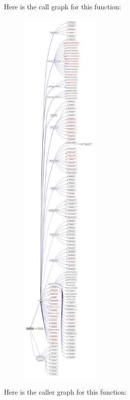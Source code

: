 Here is the call graph for this function\+:\nopagebreak
\begin{figure}[H]
\begin{center}
\leavevmode
\includegraphics[height=550pt]{namespacemodulehycomformat_a75ba9ace07164a1aac61c55e48af9959_cgraph}
\end{center}
\end{figure}
Here is the caller graph for this function\+:\nopagebreak
